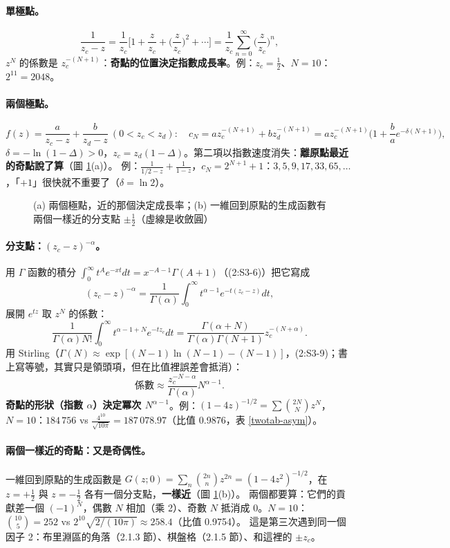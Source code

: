 \paragraph{單極點。}
\[\frac1{z_c-z}=\frac1{z_c}\Big[1+\frac z{z_c}+\Big(\frac z{z_c}\Big)^2+\cdots\Big]=\frac1{z_c}\sum_{n=0}^\infty\Big(\frac z{z_c}\Big)^n,\tag{2:S3-2}\]
$z^N$ 的係數是 $z_c^{-(N+1)}$：\textbf{奇點的位置決定指數成長率}。例：$z_c=\frac12$、$N=10$：$2^{11}=2048$。

\paragraph{兩個極點。}
\[f(z)=\frac a{z_c-z}+\frac b{z_d-z}\ (0<z_c<z_d):\quad c_N=az_c^{-(N+1)}+bz_d^{-(N+1)}=az_c^{-(N+1)}\Big(1+\frac ba e^{-\delta(N+1)}\Big),\tag{2:S3-3 -- 2:S3-5}\]
$\delta=-\ln(1-\Delta)>0$，$z_c=z_d(1-\Delta)$。第二項以指數速度消失：\textbf{離原點最近的奇點說了算}（圖 \ref{twofig-poles}(a)）。
例：$\frac1{1/2-z}+\frac1{1-z}$，$c_N=2^{N+1}+1$：$3,5,9,17,33,65,\dots$，「$+1$」很快就不重要了（$\delta=\ln2$）。
\begin{figure}[H]
\centering
\TwoFigPoles
\caption{(a) 兩個極點，近的那個決定成長率；(b) 一維回到原點的生成函數有兩個一樣近的分支點 $\pm\frac12$（虛線是收斂圓）}\label{twofig-poles}
\end{figure}

\paragraph{分支點：$(z_c-z)^{-\alpha}$。}
用 $\Gamma$ 函數的積分 $\int_0^\infty t^Ae^{-xt}dt=x^{-A-1}\Gamma(A+1)$（(2:S3-6)）把它寫成
\[(z_c-z)^{-\alpha}=\frac1{\Gamma(\alpha)}\int_0^\infty t^{\alpha-1}e^{-t(z_c-z)}dt,\tag{2:S3-7}\]
展開 $e^{tz}$ 取 $z^N$ 的係數：
\[\frac{1}{\Gamma(\alpha)N!}\int_0^\infty t^{\alpha-1+N}e^{-tz_c}dt=\frac{\Gamma(\alpha+N)}{\Gamma(\alpha)\Gamma(N+1)}z_c^{-(N+\alpha)}.\tag{2:S3-8}\]
用 Stirling（$\Gamma(N)\approx\exp[(N-1)\ln(N-1)-(N-1)]$，(2:S3-9)；書上寫等號，其實只是領頭項，但在比值裡誤差會抵消）：
\[\text{係數}\approx\frac{z_c^{-N-\alpha}}{\Gamma(\alpha)}N^{\alpha-1}.\tag{2:S3-10}\]
\textbf{奇點的形狀（指數 $\alpha$）決定冪次 $N^{\alpha-1}$}。例：$(1-4z)^{-1/2}=\sum\binom{2N}Nz^N$，$N=10$：$184\,756$ vs $\frac{4^{10}}{\sqrt{10\pi}}=187\,078.97$（比值 0.9876，表 \ref{twotab-asym}）。

\paragraph{兩個一樣近的奇點：又是奇偶性。}
一維回到原點的生成函數是 $G(z;0)=\sum_n\binom{2n}nz^{2n}=(1-4z^2)^{-1/2}$，在 $z=+\frac12$ 與 $z=-\frac12$ 各有一個分支點，\textbf{一樣近}（圖 \ref{twofig-poles}(b)）。
兩個都要算：它們的貢獻差一個 $(-1)^N$，偶數 $N$ 相加（乘 2）、奇數 $N$ 抵消成 0。$N=10$：$\binom{10}5=252$ vs $2^{10}\sqrt{2/(10\pi)}\approx258.4$（比值 0.9754）。
這是第三次遇到同一個因子 2：布里淵區的角落（2.1.3 節）、棋盤格（2.1.5 節）、和這裡的 $\pm z_c$。

